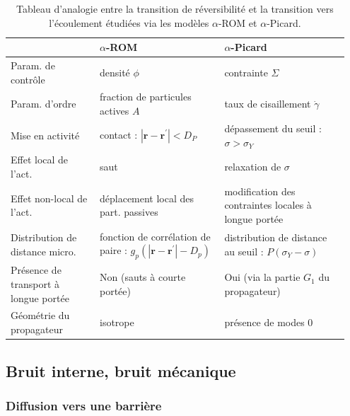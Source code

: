 \begin{table}[h]
\centering
\begin{tabular}{P{0.25\linewidth}P{0.35\linewidth}P{0.35\linewidth}}
\hline \hline  & $\alpha$-ROM & $\alpha$-Picard \\
\hline
Param. de contrôle  & densité $\phi$ & contrainte $\Sigma$ \\
Param. d'ordre & fraction de particules actives $A$ & taux de cisaillement $\dot{\gamma}$ \\
Mise en activité & contact : $|\mathbf{r}-\mathbf{r}^\prime| < D_P$ & dépassement du seuil : $\sigma > \sigma_Y$\\
Effet local de l'act. & saut & relaxation de $\sigma$ \\
Effet non-local de l'act. & déplacement local des part. passives & modification des contraintes locales à longue portée \\
Distribution de distance micro.  & fonction de corrélation de paire : $g_p(|\mathbf{r}-\mathbf{r}^\prime|-D_p)$ & distribution de distance au seuil : $P(\sigma_Y - \sigma)$\\
\hline 
Présence de transport à longue portée & Non (sauts à courte portée) & Oui (via la partie $G_1$ du propagateur) \\
Géométrie du propagateur & isotrope & présence de modes 0 \\
\hline \hline
\end{tabular}
\caption{Tableau d'analogie entre la transition de réversibilité et la transition vers l'écoulement étudiées via les modèles $\alpha$-ROM et $\alpha$-Picard.}
\label{tab:analogie}
\end{table}

\endgroup

\subsection{Bruit interne, bruit mécanique}

\subsubsection{Diffusion vers une barrière}

